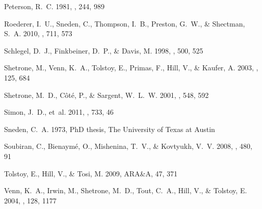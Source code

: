 \documentclass[manuscript]{aastex}
\begin{document}
\begin{thebibliography}{40}
{Peterson}, R.~C. 1981, \apj, 244, 989

{Roederer}, I.~U., {Sneden}, C., {Thompson}, I.~B., {Preston}, G.~W., \&
  {Shectman}, S.~A. 2010, \apj, 711, 573

{Schlegel}, D.~J., {Finkbeiner}, D.~P., \& {Davis}, M. 1998, \apj, 500, 525

{Shetrone}, M., {Venn}, K.~A., {Tolstoy}, E., {Primas}, F., {Hill}, V., \&
  {Kaufer}, A. 2003, \aj, 125, 684

{Shetrone}, M.~D., {C{\^o}t{\'e}}, P., \& {Sargent}, W.~L.~W. 2001, \apj, 548,
  592

{Simon}, J.~D., {et~al.} 2011, \apj, 733, 46

{Sneden}, C.~A. 1973, PhD thesis, The University of Texas at Austin

{Soubiran}, C., {Bienaym{\'e}}, O., {Mishenina}, T.~V., \& {Kovtyukh}, V.~V.
  2008, \aap, 480, 91

{Tolstoy}, E., {Hill}, V., \& {Tosi}, M. 2009, ARA\&A, 47, 371

{Venn}, K.~A., {Irwin}, M., {Shetrone}, M.~D., {Tout}, C.~A., {Hill}, V., \&
  {Tolstoy}, E. 2004, \aj, 128, 1177

\end{thebibliography}
\end{document}
